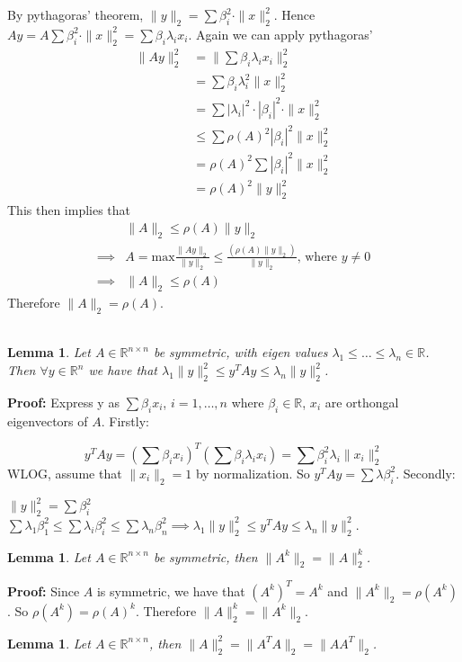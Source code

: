 \documentclass[titlepage]{article}
\theoremstyle{plain}
\newtheorem{lem}[thm]{Lemma}
\theoremstyle{definition}
\theoremstyle{remark}
\begin{document}
\noindent By pythagoras' theorem, $\|y\|_2 = \sum \beta_i^2 \cdot \|x\|_2^2$.
Hence $Ay = A \sum \beta_i^2 \cdot \|x\|_2^2 = \sum \beta_i \lambda_i x_i$.
Again we can apply pythagoras'
\begin{align*}
\|Ay\|_2^2 &= \|\sum \beta_i \lambda_i x_i\|_2^2\\
&= \sum \beta_i \lambda_i^2 \|x\|_2^2\\
&= \sum |\lambda_i|^2 \cdot |\beta_i|^2 \cdot \|x\|_2^2\\
&\leq \sum\rho(A)^2 |\beta_i|^2 \|x\|_2^2\\
&= \rho(A)^2 \sum |\beta_i|^2 \|x\|_2^2\\
&= \rho(A)^2 \|y\|_2^2
\end{align*}
This then implies that
\begin{align*}
&\|A\|_2 \leq \rho(A) \|y\|_2\\
\implies &A  = \text{max} \frac{\|Ay\|_2}{\|y\|_2} \leq \frac{(\rho(A)
\|y\|_2)}{\|y\|_2} \text{, where $y \not = 0$}\\
\implies &\|A\|_2 \leq \rho(A)
\end{align*}
Therefore $\|A\|_2 = \rho(A)$.\\\\
\begin{lem}
Let $A \in \mathbb{R}^{n \times n}$ be symmetric, with eigen values $\lambda_1
\leq \hdots \leq \lambda_n \in \mathbb{R}$. Then $\forall y \in \mathbb{R}^n$ we
have that $\lambda_1 \|y\|_2^2 \leq y^T A y \leq \lambda_n \|y\|_2^2$.
\end{lem}

\noindent \textbf{Proof: } Express y as $\sum \beta_i x_i$, $i = 1,\hdots,n$
where $\beta_i \in \mathbb{R}$, $x_i$ are orthongal eigenvectors of $A$.
Firstly:

\[y^TAy = (\sum \beta_i x_i)^T (\sum \beta_i \lambda_i x_i) = \sum \beta_i^2
\lambda_i \|x_i\|_2^2\]
WLOG, assume that $\|x_i\|_2 = 1$ by normalization. So $y^T A y = \sum \lambda
\beta_i^2$. Secondly:

$\|y\|_2^2 = \sum \beta_i^2$\\

$\sum \lambda_1 \beta_1^2 \leq \sum \lambda_i \beta_i^2 \leq \sum \lambda_n
\beta_n^2 \implies \lambda_1 \|y\|_2^2 \leq y^T A y \leq \lambda_n \|y\|_2^2$.
\begin{lem}
Let $A \in \mathbb{R}^{n\times n}$ be symmetric, then $\|A^k\|_2 = \|A\|_2^k$.
\end{lem}

\noindent \textbf{Proof: }
Since $A$ is symmetric, we have that $(A^k)^T = A^k$ and $\|A^k\|_2 =
\rho(A^k)$. So $\rho(A^k) = \rho(A)^k$. Therefore $\|A\|_2^k =\|A^k\|_2$.
\begin{lem}
Let $A \in \mathbb{R}^{n\times n}$, then $\|A\|_2^2 = \|A^T A\|_2 = \|AA^T\|_2$.
\end{lem}
\end{document}
